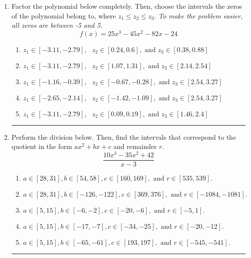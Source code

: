 \documentclass[14pt]{extbook}
\newcommand{\litem}[1]{\item#1\hspace*{-1cm}\rule{\textwidth}{0.4pt}}
\begin{document}
\begin{enumerate}
{\begin{enumerate}[label=\Alph*.]
\end{enumerate} }
\litem{
Factor the polynomial below completely. Then, choose the intervals the zeros of the polynomial belong to, where $z_1 \leq z_2 \leq z_3$. \textit{To make the problem easier, all zeros are between -5 and 5.}\[ f(x) = 25x^{3} -45 x^{2} -82 x -24 \]\begin{enumerate}[label=\Alph*.]
\item \( z_1 \in [-3.11, -2.79], \text{   }  z_2 \in [0.24, 0.6], \text{   and   } z_3 \in [0.38, 0.88] \)
\item \( z_1 \in [-3.11, -2.79], \text{   }  z_2 \in [1.07, 1.31], \text{   and   } z_3 \in [2.14, 2.54] \)
\item \( z_1 \in [-1.16, -0.39], \text{   }  z_2 \in [-0.67, -0.28], \text{   and   } z_3 \in [2.54, 3.27] \)
\item \( z_1 \in [-2.65, -2.14], \text{   }  z_2 \in [-1.42, -1.09], \text{   and   } z_3 \in [2.54, 3.27] \)
\item \( z_1 \in [-3.11, -2.79], \text{   }  z_2 \in [0.09, 0.19], \text{   and   } z_3 \in [1.46, 2.4] \)

\end{enumerate} }
\litem{
Perform the division below. Then, find the intervals that correspond to the quotient in the form $ax^2+bx+c$ and remainder $r$.\[ \frac{10x^{3} -35 x^{2} + 42}{x -3} \]\begin{enumerate}[label=\Alph*.]
\item \( a \in [28, 31], b \in [54, 58], c \in [160, 169], \text{ and } r \in [535, 539]. \)
\item \( a \in [28, 31], b \in [-126, -122], c \in [369, 376], \text{ and } r \in [-1084, -1081]. \)
\item \( a \in [5, 15], b \in [-6, -2], c \in [-20, -6], \text{ and } r \in [-5, 1]. \)
\item \( a \in [5, 15], b \in [-17, -7], c \in [-34, -25], \text{ and } r \in [-20, -12]. \)
\item \( a \in [5, 15], b \in [-65, -61], c \in [193, 197], \text{ and } r \in [-545, -541]. \)


\end{enumerate}}
\end{enumerate}
\end{document}
